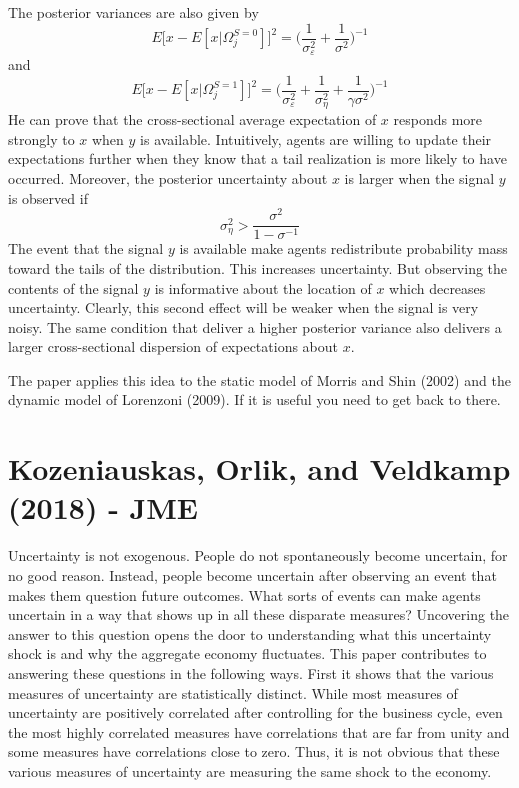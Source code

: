\documentclass{article}
\begin{document}
{The posterior variances are also given by
$$
E \big[x - E[x|\Omega^{S=0}_j] \big]^2 = \bigg( \frac{1}{\sigma^2_{\varepsilon}} + \frac{1}{\sigma^2}  \bigg)^{-1}
$$
and
$$
E \big[x - E[x|\Omega^{S=1}_j] \big]^2 = \bigg( \frac{1}{\sigma^2_{\varepsilon}} + \frac{1}{\sigma_{\eta}^2} + \frac{1}{\gamma \sigma^2}  \bigg)^{-1}
$$
He can prove that the cross-sectional average expectation of $x$ responds more strongly to $x$ when $y$ is available. Intuitively, agents are willing to update their expectations further when they know that a tail realization is more likely to have occurred. Moreover, the posterior uncertainty about $x$ is larger when the signal $y$ is observed if
$$
\sigma^2_{\eta} > \frac{\sigma^2}{1 - \sigma^{-1}}
$$
The event that the signal $y$ is available make agents redistribute probability mass toward the tails of the distribution. This increases uncertainty. But observing the contents of the signal $y$ is informative about the location of $x$ which decreases uncertainty. Clearly, this second effect will be weaker when the signal is very noisy. The same condition that deliver a higher posterior variance also delivers a larger cross-sectional dispersion of expectations about $x$.

The paper applies this idea to the static model of Morris and Shin (2002) and the dynamic model of Lorenzoni (2009). If it is useful you need to get back to there. 


\section{Kozeniauskas, Orlik, and Veldkamp (2018) - JME}

Uncertainty is not exogenous. People do not spontaneously become uncertain, for no good reason. Instead, people become uncertain after observing an event that makes them question future outcomes. What sorts of events can make agents uncertain in a way that shows up in all these disparate measures? Uncovering the answer to this question opens the door to understanding what this uncertainty shock is and why the aggregate economy fluctuates. This paper contributes to answering these questions in the following ways. First it shows that the various measures of uncertainty are statistically distinct. While most measures of uncertainty are positively correlated after controlling for the business cycle, even the most highly correlated measures have correlations that are far from unity and some measures have correlations close to zero. Thus, it is not obvious that these various measures of uncertainty are measuring the same shock to the economy.

}
\end{document}
